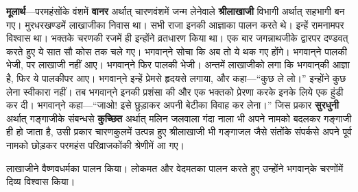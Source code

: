 \begin{sloppypar}\justifying{}
\textbf{मूलार्थ}—परमहंसोंके वंशमें \textbf{वानर} अर्थात् चारण\-वंशमें जन्म लेनेवाले \textbf{श्रीलाखाजी} विभागी अर्थात् सहभागी बन गए। मुरधरखण्डमें लाखाजीका निवास था। सभी राजा इनकी आज्ञाका पालन करते थे। इन्हें रामनामपर विश्वास था। भक्तके चरणकी रजमें ही इन्होंने व्रतधारण किया था। एक बार जगन्नाथजीके द्वारपर दण्डवत् करते हुए ये सात सौ कोस तक चले गए। भगवान्‌ने सोचा कि अब तो ये थक गए होंगे। भगवान्‌ने पालकी भेजी, पर लाखाजी नहीं आए। भगवान्‌ने फिर पालकी भेजी। अन्तमें लाखाजीको लगा कि भगवान्‌की आज्ञा है, फिर ये पालकीपर आए। भगवान्‌ने इन्हें प्रेमसे हृदयसे लगाया, और कहा—“कुछ ले लो।” इन्होंने कुछ लेना स्वीकारा नहीं। तब भगवान्‌ने इनकी प्रशंसा की और एक भक्तको प्रेरणा करके इनके लिये एक हुंडी कर दी। भगवान्‌ने कहा—“जाओ! इसे छुड़ाकर अपनी बेटीका विवाह कर लेना।” जिस प्रकार \textbf{सुरधुनी} अर्थात् गङ्गाजीके संबन्धसे \textbf{कुच्छित} अर्थात् मलिन जलवाला गंदा नाला भी अपने नामको बदलकर गङ्गाजी ही हो जाता है, उसी प्रकार चारणकुलमें उत्पन्न हुए श्रीलाखाजी भी गङ्गाजल जैसे संतोंके संपर्कसे अपने पूर्व नामको छोड़कर परमहंस परिव्राजकोंकी श्रेणीमें आ गए।
\end{sloppypar}
\begin{sloppypar}\justifying{}
लाखाजीने वैष्णव\-धर्मका पालन किया। लोकमत और वेदमतका पालन करते हुए उन्होंने भगवान्‌के चरणोंमें दिव्य विश्वास किया।
\end{sloppypar}


